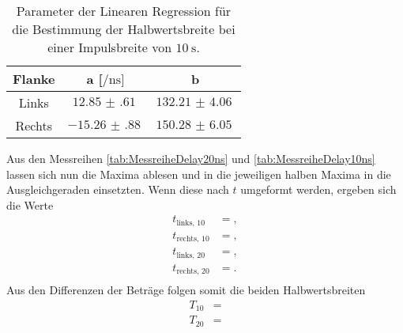 \begin{table}
    \centering
    \caption{Parameter der Linearen Regression für die Bestimmung der Halbwertsbreite bei einer Impulsbreite von $\SI{10}{\second}$.} 
    \label{tab:332211}
    \begin{tabular}{c | c c }
        \toprule
        Flanke & a [$\si{\per\nano\second}] $ & b \\
        \midrule
            Links    &      $\SI{12.85(61)}{}$      &    $\SI{132.21(406)}{}$  \\               
            Rechts    &     $\SI{-15.26(88)}{}$      &  $\SI{150.28(605)}{}$   \\ 
    \end{tabular}
\end{table}

Aus den Messreihen \ref{tab:MessreiheDelay20ns} und \ref{tab:MessreiheDelay10ns} lassen sich nun die Maxima ablesen und in die jeweiligen halben Maxima in die Ausgleichgeraden einsetzten.
Wenn diese nach $t$ umgeformt werden, ergeben sich die Werte
\begin{align}
t_{\text{links, }10} &= ,\\
t_{\text{rechts, }10} &= ,\\
t_{\text{links, }20} &= ,\\
t_{\text{rechts, }20} &= .\\
\end{align}
Aus den Differenzen der Beträge folgen somit die beiden Halbwertsbreiten
\begin{align}
T_{10} &= \\
T_{20} &= \\
\end{align}